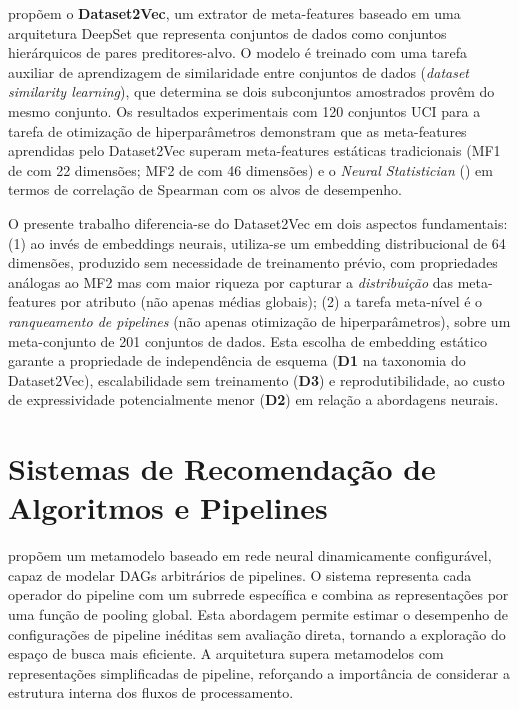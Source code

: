  propõem o \textbf{Dataset2Vec}, um extrator de meta-features baseado em uma arquitetura DeepSet que representa conjuntos de dados como conjuntos hierárquicos de pares preditores-alvo. O modelo é treinado com uma tarefa auxiliar de aprendizagem de similaridade entre conjuntos de dados (\textit{dataset similarity learning}), que determina se dois subconjuntos amostrados provêm do mesmo conjunto. Os resultados experimentais com 120 conjuntos UCI para a tarefa de otimização de hiperparâmetros demonstram que as meta-features aprendidas pelo Dataset2Vec superam meta-features estáticas tradicionais (MF1 de  com 22 dimensões; MF2 de  com 46 dimensões) e o \textit{Neural Statistician} () em termos de correlação de Spearman com os alvos de desempenho.

O presente trabalho diferencia-se do Dataset2Vec em dois aspectos fundamentais: (1) ao invés de embeddings neurais, utiliza-se um embedding distribucional de 64 dimensões, produzido sem necessidade de treinamento prévio, com propriedades análogas ao MF2 mas com maior riqueza por capturar a \textit{distribuição} das meta-features por atributo (não apenas médias globais); (2) a tarefa meta-nível é o \textit{ranqueamento de pipelines} (não apenas otimização de hiperparâmetros), sobre um meta-conjunto de 201 conjuntos de dados. Esta escolha de embedding estático garante a propriedade de independência de esquema (\textbf{D1} na taxonomia do Dataset2Vec), escalabilidade sem treinamento (\textbf{D3}) e reprodutibilidade, ao custo de expressividade potencialmente menor (\textbf{D2}) em relação a abordagens neurais.

\section{Sistemas de Recomendação de Algoritmos e Pipelines}
\label{sec:relRecomendacao}

 propõem um metamodelo baseado em rede neural dinamicamente configurável, capaz de modelar DAGs arbitrários de pipelines. O sistema representa cada operador do pipeline com um subrrede específica e combina as representações por uma função de pooling global. Esta abordagem permite estimar o desempenho de configurações de pipeline inéditas sem avaliação direta, tornando a exploração do espaço de busca mais eficiente. A arquitetura supera metamodelos com representações simplificadas de pipeline, reforçando a importância de considerar a estrutura interna dos fluxos de processamento.

